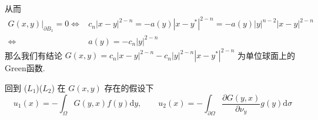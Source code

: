 \documentclass[11pt]{ctexart}[UTF8]
\begin{document}
从而
\begin{equation*}
    \begin{aligned}
        G(x,y)\big|_{\partial B_{1}} = 0 \Longleftrightarrow & c_{n}|x-y|^{2-n} = -a(y)|x-y^{*}|^{2-n} = -a(y) |y|^{n-2} |x-y|^{2-n} \\
        \Longleftrightarrow & a(y) = -c_{n} |y|^{2-n}
    \end{aligned}
\end{equation*}
那么我们有结论 $G(x,y) = c_{n}|x-y|^{2-n} - c_{n} |y|^{2-n} |x-y^{*}|^{2-n}$ 为单位球面上的Green函数. \par
回到 ($L_{1}$)($L_{2}$) 在 $G(x,y)$ 存在的假设下
\begin{equation*}
    u_{1}(x) = -\int_{\Omega} G(y,x) f(y) \mathrm{d}y,\quad\quad u_{2}(x) = - \int_{\partial\Omega} \frac{\partial G(y,x)}{\partial \nu_{y}} g(y) \mathrm{d}\sigma
\end{equation*}
\end{document}
